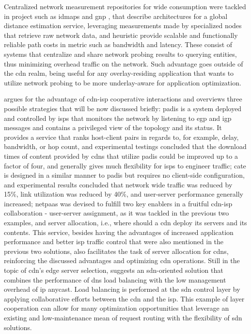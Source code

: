     Centralized network measurement repositories for wide consumption were tackled in project such as \gls{idmaps} \cite{idmaps} and \gls{gnp} \cite{gnp}, that describe architectures for a global distance estimation service, leveraging measurements made by specialized nodes that retrieve raw network data, and heuristic provide scalable and functionally reliable path costs in metric such as bandwidth and latency.
    These consist of systems that centralize and share network probing results to querying entities, thus minimizing overhead traffic on the network.
    Such advantage goes outside of the \gls{cdn} realm, being useful for any overlay-residing application that wants to utilize network probing to be more underlay-aware for application optimization.

    \cite{cdn-isp-cooperations} argues for the advantage of \gls{cdn}-\gls{isp} cooperative interactions and overviews three possible strategies that will be now discussed briefly: \gls{padis} \cite{pfa-10} is a system deployed and controlled by \glspl{isp} that monitors the network by listening to \gls{egp} and \gls{igp} messages and contains a privileged view of the topology and its status.
    It provides a service that ranks host-client pairs in regards to, for example, delay, bandwidth, or hop count, and experimental testings concluded that the download times of content provided by \glspl{cdn} that utilize \gls{padis} could be improved up to a factor of four, and generally gives much flexibility for \glspl{isp} to engineer traffic; \gls{cate}  \cite{fps-12} is designed in a similar manner to \gls{padis} but requires no client-side configuration, and experimental results concluded that network wide traffic was reduced by 15\%, link utilization was reduced by 40\%, and user-server performance generally increased; \gls{netpaas} \cite{pushing-cdn-isp-collaboration} was devised to fulfill two key enablers in a fruitful \gls{cdn}-\gls{isp} collaboration - user-server assignment, as it was tackled in the previous two examples, and server allocation, i.e., where should a \gls{cdn} deploy its servers and its contents.
    This service, besides having the advantages of increased application performance and better \gls{isp} traffic control that were also mentioned in the previous two solutions, also facilitates the task of server allocation for \glspl{cdn}, reinforcing the discussed advantages and optimizing \gls{cdn} operations.
    Still in the topic of \gls{cdn}'s edge server selection, \cite{wichtlhuber2017} suggests an \gls{sdn}-oriented solution that combines the performance of \gls{dns} load balancing with the low management overhead of \gls{ip} anycast.
    Load balancing is performed at the \gls{sdn} control layer by applying collaborative efforts between the \gls{cdn} and the \gls{isp}.
    This example of layer cooperation can allow for many optimization opportunities that leverage an existing and low-maintenance mean of request routing with the flexibility of \gls{sdn} solutions.

